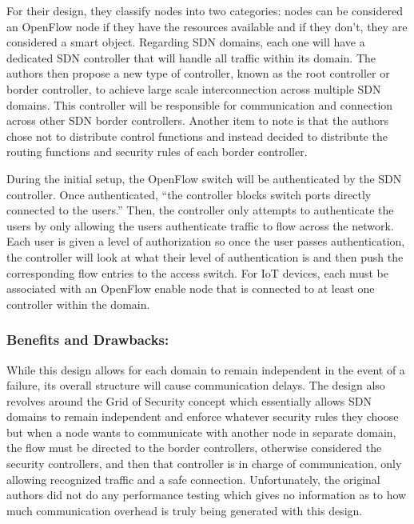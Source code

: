 \smallskip

For their design, they classify nodes into two categories: nodes can be considered an OpenFlow node if they have the resources available and if they don’t, they are considered a smart object. Regarding SDN domains, each one will have a dedicated SDN controller that will handle all traffic within its domain. The authors then propose a new type of controller, known as the root controller or border controller, to achieve large scale interconnection across multiple SDN domains. \cite {flauzac2015sdn} This controller will be responsible for communication and connection across other SDN border controllers. Another item to note is that the authors chose not to distribute control functions and instead decided to distribute the routing functions and security rules of each border controller. \cite {flauzac2015sdn}

\smallskip

During the initial setup, the OpenFlow switch will be authenticated by the SDN controller. Once authenticated, “the controller blocks switch ports directly connected to the users.” \cite {flauzac2015sdn} Then, the controller only attempts to authenticate the users by only allowing the users authenticate traffic to flow across the network. Each user is given a level of authorization so once the user passes authentication, the controller will look at what their level of authentication is and then push the corresponding flow entries to the access switch. \cite {flauzac2015sdn} For IoT devices, each must be associated with an OpenFlow enable node that is connected to at least one controller within the domain.

\subsubsection {Benefits and Drawbacks:}
\smallskip

While this design allows for each domain to remain independent in the event of a failure, its overall structure will cause communication delays. The design also revolves around the Grid of Security concept which essentially allows SDN domains to remain independent and enforce whatever security rules they choose but when a node wants to communicate with another node in separate domain, the flow must be directed to the border controllers, otherwise considered the security controllers, and then that controller is in charge of communication, only allowing recognized traffic and a safe connection. Unfortunately, the original authors did not do any performance testing which gives no information as to how much communication overhead is truly being generated with this design.


